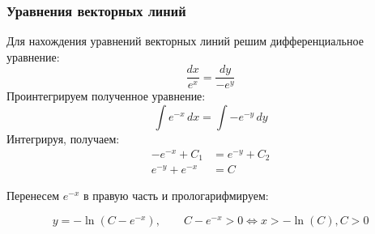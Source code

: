 \begin{frame}\frametitle{Уравнения векторных линий}

	Для нахождения уравнений векторных линий решим дифференциальное уравнение:
	\begin{equation*}
		\frac{dx}{e^x} = \frac{dy}{-e^y}
		\label{eq:vec_lines_definition}
	\end{equation*}
	Проинтегрируем полученное уравнение:
	\begin{equation*}
		\int e^{-x} \, dx = \int -e^{-y} \, dy
		\label{eq:vec_lines_int}
	\end{equation*}
	Интегрируя, получаем:
	\begin{align*}
		-e^{-x} + C_1    & = e^{-y} + C_2 \\
		e^{-y}  + e^{-x} & = C
		\label{eq:vec_lines_integrated}
	\end{align*}

	Перенесем \(e^{-x}\) в правую часть и прологарифмируем:

	\begin{equation}
		y = - \ln(C - e^{-x}), \qquad
		C - e^{-x} > 0 \Longleftrightarrow x > - \ln(C), C > 0
		\label{eq:vec_lines}
	\end{equation}

\end{frame}
